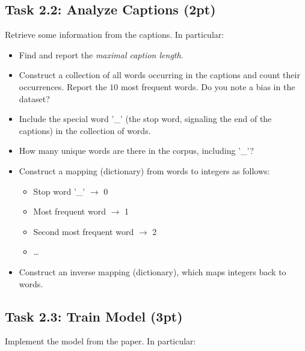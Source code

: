 \documentclass[a4paper,twoside,10pt]{article}
\begin{document}
	
\subsection*{Task 2.2: Analyze Captions (2pt)}

Retrieve some information from the captions.
In particular:
\begin{itemize}
\item Find and report the \emph{maximal caption length}.
\item Construct a collection of all words occurring in the captions and count their occurrences. Report the $10$ most frequent words. Do you note a bias in the dataset?
\item Include the special word '\_' (the stop word, signaling the end of the captions) in the collection of words.
\item How many unique words are there in the corpus, including '\_'?
\item Construct a mapping (dictionary) from words to integers as follows:
\begin{itemize}
\item Stop word '\_' $\rightarrow$  0
\item Most frequent word $\rightarrow$  1
\item Second most frequent word $\rightarrow$ 2
\item \dots
\end{itemize}
\item Construct an inverse mapping (dictionary), which maps integers back to words.
\end{itemize}
	
	
\subsection*{Task 2.3: Train Model (3pt)}   

Implement the model from the paper. 
In particular:
\end{document}
